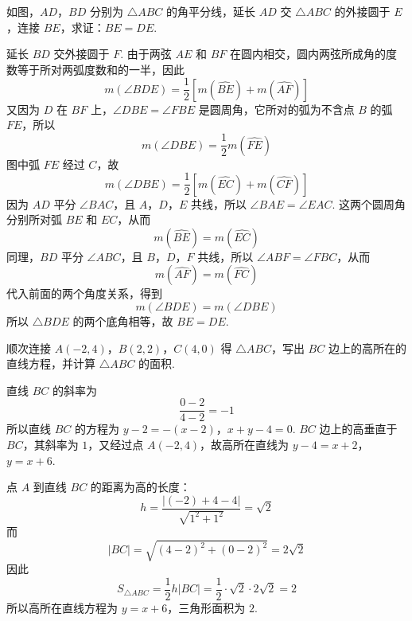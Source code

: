 \begin{problem}
如图，\(AD\)，\(BD\) 分别为 \(\triangle ABC\) 的角平分线，延长 \(AD\) 交 \(\triangle ABC\) 的外接圆于 \(E\)，连接 \(BE\)，求证：\(BE=DE\).

\end{problem}

\begin{solution}
延长 \(BD\) 交外接圆于 \(F\). 由于两弦 \(AE\) 和 \(BF\) 在圆内相交，圆内两弦所成角的度数等于所对两弧度数和的一半，因此
\[
m\left(\angle BDE\right)=\frac12\left[m\left(\widehat{BE}\right)+m\left(\widehat{AF}\right)\right]
\]
又因为 \(D\) 在 \(BF\) 上，\(\angle DBE=\angle FBE\) 是圆周角，它所对的弧为不含点 \(B\) 的弧 \(FE\)，所以
\[
m\left(\angle DBE\right)=\frac12m\left(\widehat{FE}\right)
\]
图中弧 \(FE\) 经过 \(C\)，故
\[
m\left(\angle DBE\right)=\frac12\left[m\left(\widehat{EC}\right)+m\left(\widehat{CF}\right)\right]
\]
因为 \(AD\) 平分 \(\angle BAC\)，且 \(A\)，\(D\)，\(E\) 共线，所以
\(\angle BAE=\angle EAC\). 这两个圆周角分别所对弧 \(BE\) 和 \(EC\)，从而
\[
m\left(\widehat{BE}\right)=m\left(\widehat{EC}\right)
\]
同理，\(BD\) 平分 \(\angle ABC\)，且 \(B\)，\(D\)，\(F\) 共线，所以
\(\angle ABF=\angle FBC\)，从而
\[
m\left(\widehat{AF}\right)=m\left(\widehat{FC}\right)
\]
代入前面的两个角度关系，得到
\[
m\left(\angle BDE\right)=m\left(\angle DBE\right)
\]
所以 \(\triangle BDE\) 的两个底角相等，故 \(BE=DE\).
\end{solution}

\begin{problem}
顺次连接 \(A(-2,4)\)，\(B(2,2)\)，\(C(4,0)\) 得 \(\triangle ABC\)，写出 \(BC\) 边上的高所在的直线方程，并计算 \(\triangle ABC\) 的面积.
\end{problem}

\begin{solution}
直线 \(BC\) 的斜率为
\[
\frac{0-2}{4-2}=-1
\]
所以直线 \(BC\) 的方程为
\(y-2=-(x-2)\)，\(x+y-4=0\).
\(BC\) 边上的高垂直于 \(BC\)，其斜率为 \(1\)，又经过点 \(A(-2,4)\)，故高所在直线为
\(y-4=x+2\)，\(y=x+6\).

点 \(A\) 到直线 \(BC\) 的距离为高的长度：
\[
h=\frac{|(-2)+4-4|}{\sqrt{1^2+1^2}}=\sqrt2
\]
而
\[
|BC|=\sqrt{(4-2)^2+(0-2)^2}=2\sqrt2
\]
因此
\[
S_{\triangle ABC}=\frac12h|BC|=\frac12\cdot\sqrt2\cdot2\sqrt2=2
\]
所以高所在直线方程为 \(y=x+6\)，三角形面积为 \(2\).
\end{solution}

